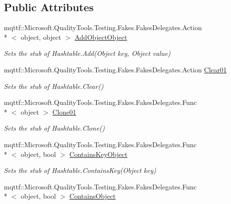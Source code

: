 \subsection*{Public Attributes}
\begin{DoxyCompactItemize}
\item 
mqttf\-::\-Microsoft.\-Quality\-Tools.\-Testing.\-Fakes.\-Fakes\-Delegates.\-Action\\*
$<$ object, object $>$ \hyperlink{class_system_1_1_configuration_1_1_fakes_1_1_stub_settings_context_ad3f6284ab214562327134b7b78976344}{Add\-Object\-Object}
\begin{DoxyCompactList}\small\item\em Sets the stub of Hashtable.\-Add(\-Object key, Object value)\end{DoxyCompactList}\item 
mqttf\-::\-Microsoft.\-Quality\-Tools.\-Testing.\-Fakes.\-Fakes\-Delegates.\-Action \hyperlink{class_system_1_1_configuration_1_1_fakes_1_1_stub_settings_context_a11656d4c5c61d1420912bef61ee0f9b6}{Clear01}
\begin{DoxyCompactList}\small\item\em Sets the stub of Hashtable.\-Clear()\end{DoxyCompactList}\item 
mqttf\-::\-Microsoft.\-Quality\-Tools.\-Testing.\-Fakes.\-Fakes\-Delegates.\-Func\\*
$<$ object $>$ \hyperlink{class_system_1_1_configuration_1_1_fakes_1_1_stub_settings_context_ae76fefeca9c37aba7f0633585758e6ad}{Clone01}
\begin{DoxyCompactList}\small\item\em Sets the stub of Hashtable.\-Clone()\end{DoxyCompactList}\item 
mqttf\-::\-Microsoft.\-Quality\-Tools.\-Testing.\-Fakes.\-Fakes\-Delegates.\-Func\\*
$<$ object, bool $>$ \hyperlink{class_system_1_1_configuration_1_1_fakes_1_1_stub_settings_context_a4f23811f03a3a5e4f42611fa9592d583}{Contains\-Key\-Object}
\begin{DoxyCompactList}\small\item\em Sets the stub of Hashtable.\-Contains\-Key(\-Object key)\end{DoxyCompactList}\item 
mqttf\-::\-Microsoft.\-Quality\-Tools.\-Testing.\-Fakes.\-Fakes\-Delegates.\-Func\\*
$<$ object, bool $>$ \hyperlink{class_system_1_1_configuration_1_1_fakes_1_1_stub_settings_context_aee986a4c0cdcb11d5a98efda0f920348}{Contains\-Object}

\end{DoxyCompactItemize}
